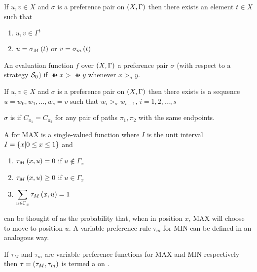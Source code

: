 \begin{defi}
If $u,v\in X$ and $\sigma$ is a preference pair on $\left( X,\Gamma\right)$ then  \iffTx{} there exists an element $t\in X$ such that
\begin{enumerate}
 \item $u,v\in\Gamma^t$
 \item $u=\sigma_M\left(t\right)$ or $v=\sigma_m\left(t\right)$
\end{enumerate}
\cite{conf/ijcai/Boffey73}
\end{defi}

\begin{defi}
An evaluation function $f$ over $\left( X,\Gamma\right)$  a preference pair $\sigma$ (with respect to a strategy $\mathcal{S}_0$) if $\ffun{x}>\ffun{y}$ whenever $x>_\sigma y$.
\cite{conf/ijcai/Boffey73}
\end{defi}

\begin{defi}
If $u,v\in X$ and $\sigma$ is a preference pair on $\left( X,\Gamma\right)$ then  \iffTx{} there exists is a sequence $u=w_0,w_1,\ldots,w_s=v$ such that $w_i>_\sigma w_{i-1}$, $i=1,2,\ldots,s$
\cite{conf/ijcai/Boffey73}
\end{defi}

\begin{defi}
$\sigma$ is  if $C_{\pi_1}=C_{\pi_2}$ for any pair of paths $\pi_1,\pi_2$ with the same endpoints.
\cite{conf/ijcai/Boffey73}
\end{defi}

\begin{defi}
A  for MAX is a single-valued function  where $I$ is the unit interval $I=\left\{ x|0\leq x\leq 1\right\}$ and
\begin{enumerate}
 \item $\tau_M\left(x,u\right)=0$ if $u\notin\Gamma_x$
 \item $\tau_M\left(x,u\right)\geq 0$ if $u\in\Gamma_x$
 \item $\displaystyle\sum_{u\in\Gamma_x}{\tau_M\left(x,u\right)}=1$
\end{enumerate}
 can be thought of as the probability that, when in position $x$, MAX will choose to move to position $u$. A variable preference rule $\tau_m$ for MIN can be defined in an analogous way.
\cite{conf/ijcai/Boffey73}
\end{defi}

\begin{defi}
If $\tau_M$ and $\tau_m$ are variable preference functions for MAX and MIN respectively then $\tau=\left( \tau_M,\tau_m\right)$ is termed a  on .
\cite{conf/ijcai/Boffey73}
\end{defi}